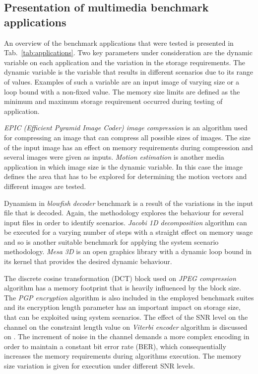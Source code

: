 \documentclass[a4paper,conference]{IEEEtran}
\begin{document}
\subsection{Presentation of multimedia benchmark applications}

An overview of the benchmark applications that were tested is presented in Tab.~\ref{tab:applications}. Two key parameters under consideration are the dynamic variable on each application and the variation in the storage requirements. The dynamic variable is the variable that results in different scenarios due to its range of values. Examples of such a variable are an input image of varying size or a loop bound with a non-fixed value. The memory size limits are defined as the minimum and maximum storage requirement occurred during testing of application.

\textit{EPIC (Efficient Pyramid Image Coder) image compression} is an algorithm used for compressing an image that can compress all possible sizes of images. The size of the input image has an effect on memory requirements during compression and several images were given as inputs. \textit{Motion estimation} is another media application in which image size is the dynamic variable. In this case the image defines the area that has to be explored for determining the motion vectors and different images are tested.

Dynamism in \textit{blowfish decoder} benchmark is a result of the variations in the input file that is decoded. Again, the methodology explores the behaviour for several input files in order to identify scenarios. \textit{Jacobi 1D decomposition} algorithm can be executed for a varying number of steps with a straight effect on memory usage and so is another suitable benchmark for applying the system scenario methodology. \textit{Mesa 3D} is an open graphics library with a dynamic loop bound in its kernel that provides the desired dynamic behaviour. 

The discrete cosine transformation (DCT) block used on \textit{JPEG compression} algorithm has a memory footprint that is heavily influenced by the block size. The \textit{PGP encryption} algorithm is also included in the employed benchmark suites and its encryption length parameter has an important impact on storage size, that can be exploited using system scenarios. The effect of the SNR level on the channel on the constraint length value on \textit{Viterbi encoder} algorithm is discussed on \cite{Fil12}. The increment of noise in the channel demands a more complex encoding in order to maintain a constant bit error rate (BER), which consequentially increases the memory requirements during algorithms execution. The memory size variation is given for execution under different SNR levels.  
\end{document}
